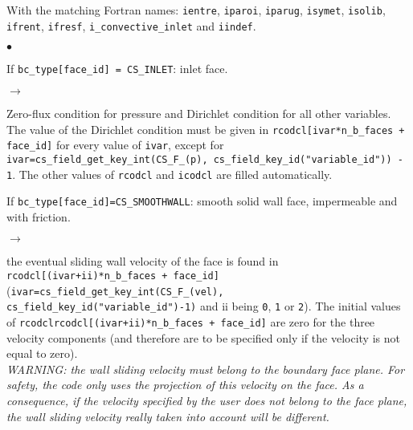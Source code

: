 With the matching Fortran names:
\texttt{ientre}, \texttt{iparoi},
\texttt{iparug}, \texttt{isymet},
\texttt{isolib}, \texttt{ifrent}, \texttt{ifresf},
\texttt{i\_convective\_inlet} and \texttt{iindef}.

\begin{list}{$\bullet$}{}
\item If \texttt{bc\_type[face\_id] = CS\_INLET}: inlet face.

\begin{list}{$\rightarrow$}{}
\item Zero-flux condition for pressure and Dirichlet condition for all
      other variables. The value of the Dirichlet condition must be given in
      \texttt{rcodcl[ivar*n\_b\_faces + face\_id]} for every value of \texttt{ivar}, except for
      \texttt{ivar=cs\_field\_get\_key\_int(CS\_F\_(p), cs\_field\_key\_id("variable\_id")) - 1}. The other values of \texttt{rcodcl} and
      \texttt{icodcl} are filled automatically.
\end{list}

\item If \texttt{bc\_type[face\_id]=CS\_SMOOTHWALL}: smooth solid wall face, impermeable and with friction.

\begin{list}{$\rightarrow$}{}
\item the eventual sliding wall velocity of the face is
      found in \texttt{rcodcl[(ivar+ii)*n\_b\_faces + face\_id]} (\texttt{ivar=cs\_field\_get\_key\_int(CS\_F\_(vel),
      cs\_field\_key\_id("variable\_id")-1)} and ii being
      \texttt{0}, \texttt{1} or \texttt{2}). The initial
      values of \texttt{rcodclrcodcl[(ivar+ii)*n\_b\_faces + face\_id]} are zero for
      the three velocity components (and therefore are to be specified
      only if the velocity is not equal to zero). \\
{\em WARNING: the wall sliding velocity must belong to the boundary face
      plane. For safety, the code only uses the projection of this
      velocity on the face. As a consequence, if the velocity specified
      by the user does not belong to the face plane, the wall sliding velocity really
      taken into account will be different.}


\end{list}
\end{list}
